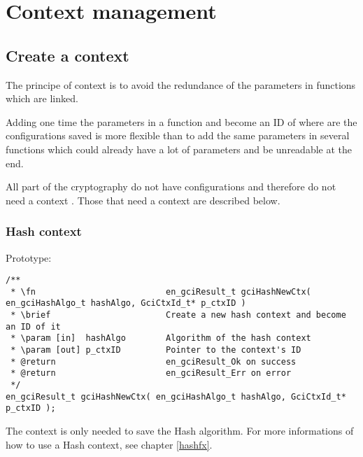 \chapter{Context management}


\section{Create a context}
The principe of context is to avoid the redundance of the parameters in
functions which are linked.

Adding one time the parameters in a function and become an ID of where are the
configurations saved is more flexible than to add the same parameters in several
functions which could already have a lot of parameters and be unreadable at the
end.

All part of the cryptography do not have configurations and therefore do not
need a context .
Those that need a context are described below.




\subsection{Hash context}
\label{hashCtx}

Prototype:

\begin{lstlisting}
/**
 * \fn							en_gciResult_t gciHashNewCtx( en_gciHashAlgo_t hashAlgo, GciCtxId_t* p_ctxID )
 * \brief						Create a new hash context and become an ID of it
 * \param [in]  hashAlgo 		Algorithm of the hash context
 * \param [out] p_ctxID			Pointer to the context's ID
 * @return						en_gciResult_Ok on success
 * @return						en_gciResult_Err on error
 */
en_gciResult_t gciHashNewCtx( en_gciHashAlgo_t hashAlgo, GciCtxId_t* p_ctxID );
\end{lstlisting}

The context is only needed to save the Hash algorithm.
For more informations of how to use a Hash context, see chapter \ref{hashfx}.




